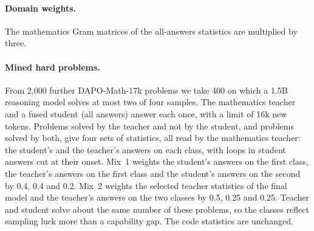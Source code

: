\paragraph{Domain weights.} The mathematics Gram matrices of the
all-answers statistics are multiplied by three.

\paragraph{Mined hard problems.} From 2{,}000 further DAPO-Math-17k
problems we take 400 on which a 1.5B reasoning model solves at most two of
four samples. The mathematics teacher and a fused student (all answers)
answer each once, with a limit of 16k new tokens. Problems solved by the
teacher and not by the student, and problems solved by both, give four sets
of statistics, all read by the mathematics teacher: the student's and the
teacher's answers on each class, with loops in student answers cut at their
onset. Mix~1 weights the student's answers on the first class, the teacher's
answers on the first class and the student's answers on the second by 0.4,
0.4 and 0.2. Mix~2 weights the selected teacher statistics of the final model
and the teacher's answers on the two classes by 0.5, 0.25 and 0.25. Teacher
and student solve about the same number of these problems, so the classes
reflect sampling luck more than a capability gap. The code statistics are
unchanged.

